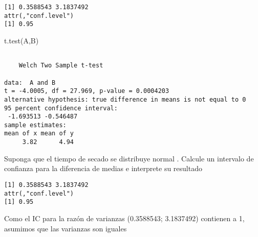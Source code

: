 \documentclass[
]{article}
\newenvironment{Shaded}{\begin{snugshade}}{\end{snugshade}}
\newcommand{\AttributeTok}[1]{\textcolor[rgb]{0.77,0.63,0.00}{#1}}
\newcommand{\FunctionTok}[1]{\textcolor[rgb]{0.00,0.00,0.00}{#1}}
\newcommand{\NormalTok}[1]{#1}
\newcommand{\SpecialCharTok}[1]{\textcolor[rgb]{0.00,0.00,0.00}{#1}}
\begin{document}
\begin{Shaded}
\end{Shaded}

\begin{verbatim}
[1] 0.3588543 3.1837492
attr(,"conf.level")
[1] 0.95
\end{verbatim}

\begin{Shaded}
\begin{Highlighting}[]
\FunctionTok{t.test}\NormalTok{(A,B)}
\end{Highlighting}
\end{Shaded}

\begin{verbatim}

    Welch Two Sample t-test

data:  A and B
t = -4.0005, df = 27.969, p-value = 0.0004203
alternative hypothesis: true difference in means is not equal to 0
95 percent confidence interval:
 -1.693513 -0.546487
sample estimates:
mean of x mean of y 
     3.82      4.94 
\end{verbatim}

Suponga que el tiempo de secado se distribuye normal . Calcule un
intervalo de confianza para la diferencia de medias e interprete su
resultado

\begin{Shaded}
\end{Shaded}

\begin{verbatim}
[1] 0.3588543 3.1837492
attr(,"conf.level")
[1] 0.95
\end{verbatim}

Como el IC para la razón de varianzas (0.3588543; 3.1837492) contienen a
1, asumimos que las varianzas son iguales

\begin{Shaded}
\end{Shaded}
\end{document}
